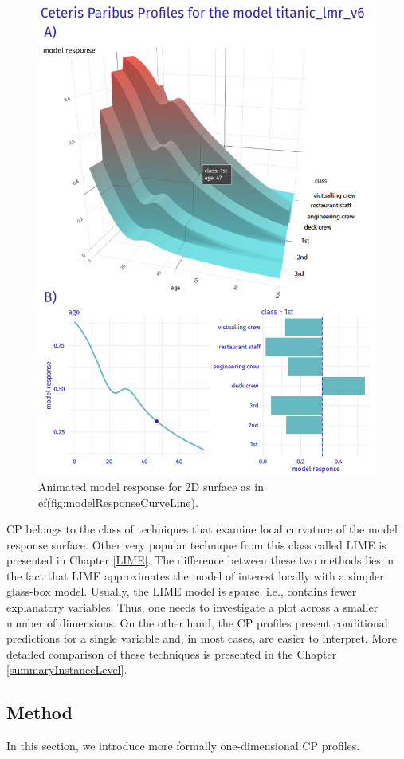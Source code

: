 \documentclass[12pt,]{krantz}
\begin{document}
\begin{figure}

{\centering \includegraphics[width=0.6\linewidth]{figure/profile_age_class} 

}

\caption{Animated model response for 2D surface as in 
ef(fig:modelResponseCurveLine).}\label{fig:modelResponseCurveAnimation}
\end{figure}

CP belongs to the class of techniques that examine local curvature of the model response surface. Other very popular technique from this class called LIME is presented in Chapter \ref{LIME}.
The difference between these two methods lies in the fact that LIME approximates the model of interest locally with a simpler glass-box model. Usually, the LIME model is sparse, i.e., contains fewer explanatory variables. Thus, one needs to investigate a plot across a smaller number of dimensions. On the other hand, the CP profiles present conditional predictions for a single variable and, in most cases, are easier to interpret. More detailed comparison of these techniques is presented in the Chapter \ref{summaryInstanceLevel}.

\hypertarget{CPMethod}{%
\subsection{Method}\label{CPMethod}}

In this section, we introduce more formally one-dimensional CP profiles.
\end{document}
